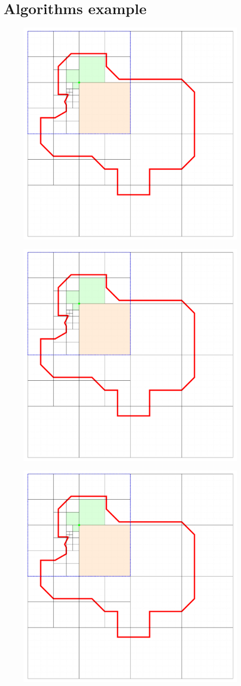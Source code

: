     \section*{Algorithms example}
    \begin{figure}[!ht]
        \centering
        \includegraphics[page=1, width=0.55\linewidth]{figures/cellinpolygon/example}
    \end{figure}
    \begin{figure}[!ht]
        \centering
        \includegraphics[page=2, width=0.55\linewidth]{figures/cellinpolygon/example}
    \end{figure}
    \begin{figure}[!ht]
        \centering
        \includegraphics[page=3, width=0.55\linewidth]{figures/cellinpolygon/example}
    \end{figure}